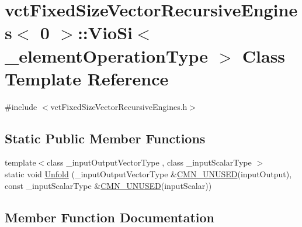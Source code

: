 \hypertarget{classvct_fixed_size_vector_recursive_engines_3_010_01_4_1_1_vio_si}{}\section{vct\+Fixed\+Size\+Vector\+Recursive\+Engines$<$ 0 $>$\+:\+:Vio\+Si$<$ \+\_\+element\+Operation\+Type $>$ Class Template Reference}
\label{classvct_fixed_size_vector_recursive_engines_3_010_01_4_1_1_vio_si}


{\ttfamily \#include $<$vct\+Fixed\+Size\+Vector\+Recursive\+Engines.\+h$>$}

\subsection*{Static Public Member Functions}
\begin{DoxyCompactItemize}
\item 
{\footnotesize template$<$class \+\_\+input\+Output\+Vector\+Type , class \+\_\+input\+Scalar\+Type $>$ }\\static void \hyperlink{classvct_fixed_size_vector_recursive_engines_3_010_01_4_1_1_vio_si_a7ffb20fd0fc73180bb087799959225c2}{Unfold} (\+\_\+input\+Output\+Vector\+Type \&\hyperlink{cmn_portability_8h_a021894e2626935fa2305434b1e893ff6}{C\+M\+N\+\_\+\+U\+N\+U\+S\+E\+D}(input\+Output), const \+\_\+input\+Scalar\+Type \&\hyperlink{cmn_portability_8h_a021894e2626935fa2305434b1e893ff6}{C\+M\+N\+\_\+\+U\+N\+U\+S\+E\+D}(input\+Scalar))
\end{DoxyCompactItemize}


\subsection{Member Function Documentation}
\hypertarget{classvct_fixed_size_vector_recursive_engines_3_010_01_4_1_1_vio_si_a7ffb20fd0fc73180bb087799959225c2}{}
